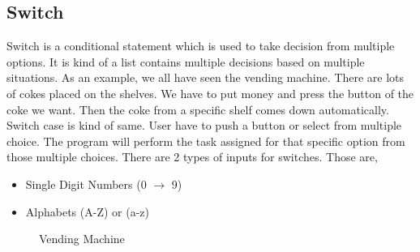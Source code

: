 \documentclass[openany]{book}  %
\begin{document}
\subsection{Switch}
Switch is a conditional statement which is used to take decision from multiple options. It is kind of a list contains multiple decisions based on multiple situations.
As an example, we all have seen the vending machine. There are lots of cokes placed on the shelves. We have to put money and press the button of the coke we want. Then the
coke from a specific shelf comes down automatically. Switch case is kind of same. User have to push a button or select from multiple choice. The program will perform the task
assigned for that specific option from those multiple choices. There are 2 types of inputs for switches. Those are,
\begin{itemize}
    \item Single Digit Numbers (0 $\to$ 9)
    \item Alphabets (A-Z) or (a-z)
\end{itemize}
% 
% 
\begin{figure}[htbp]
    \begin{center}
        \caption{Vending Machine\cite{Ref10}}
    \end{center}
\end{figure}
% 
%
\end{document}
